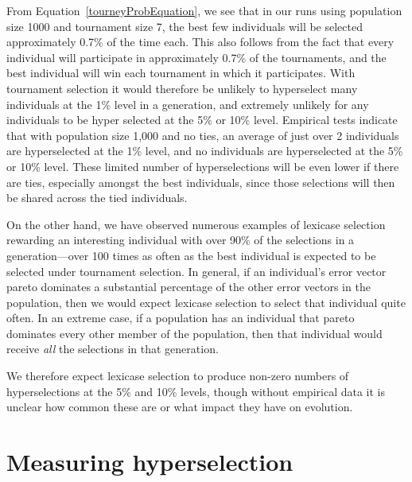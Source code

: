 \documentclass{sig-alternate}
\begin{document}
From Equation~\ref{tourneyProbEquation}, we see that in our runs using population size 1000 and tournament size 7, the best few individuals will be selected approximately 0.7\% of the time each. This also follows from the fact that every individual will participate in approximately 0.7\% of the tournaments, and the best individual will win each tournament in which it participates.
With tournament selection it would therefore be unlikely to hyperselect many individuals at the 1\% level in a generation, and extremely unlikely for any individuals to be hyper selected at the 5\% or 10\% level. Empirical tests indicate that with population size 1,000 and no ties, an average of just over 2 individuals are hyperselected at the 1\% level, and no individuals are hyperselected at the 5\% or 10\% level. These limited number of hyperselections will be even lower if there are ties, especially amongst the best individuals, since those selections will then be shared across the tied individuals.

On the other hand, we have observed numerous examples of lexicase selection rewarding an interesting individual with over 90\% of the selections in a generation---over 100 times as often as the best individual is expected to be selected under tournament selection. In general, if an individual's error vector pareto dominates a substantial percentage of the other error vectors in the population, then we would expect lexicase selection to select that individual quite often. In an extreme case, if a population has an individual that pareto dominates every other member of the population, then that individual would receive \emph{all} the selections in that generation.

We therefore expect lexicase selection to produce non-zero numbers of hyperselections at the 5\% and 10\% levels, though without empirical data it is unclear how common these are or what impact they have on evolution.

\section{Measuring hyperselection}
\label{section:experiments}
\end{document}
